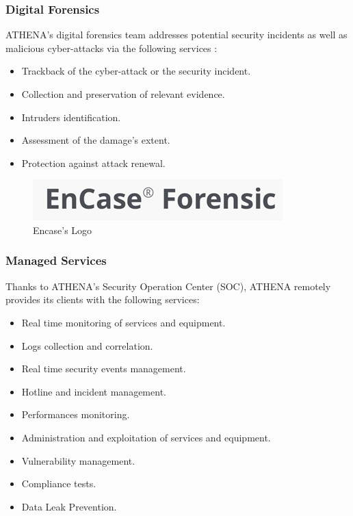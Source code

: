 \subsubsection{Digital Forensics}
ATHENA's digital forensics team addresses potential security incidents as well as malicious cyber-attacks via the following services :
\begin{itemize}
    \item Trackback of the cyber-attack or the security incident.
    \item Collection and preservation of relevant evidence.
    \item Intruders identification.
    \item Assessment of the damage's extent.
    \item Protection against attack renewal.
\end{itemize}
\begin{figure}[!htpb]
\begin{center}
\includegraphics{images/ATHENAdigitalf.png}
\caption{Encase's Logo}
\label{schema}
\end{center}
\end{figure} 
\subsubsection{Managed Services}
Thanks to ATHENA's Security Operation Center (SOC), ATHENA remotely provides its clients with the following services:
\begin{itemize}
    \item Real time monitoring of services and equipment.
    \item Logs collection and correlation.
    \item Real time security events management.
    \item Hotline and incident management.
    \item Performances monitoring.
    \item Administration and exploitation of services and equipment.
    \item Vulnerability management.
    \item Compliance tests.
    \item Data Leak Prevention.
\end{itemize}

